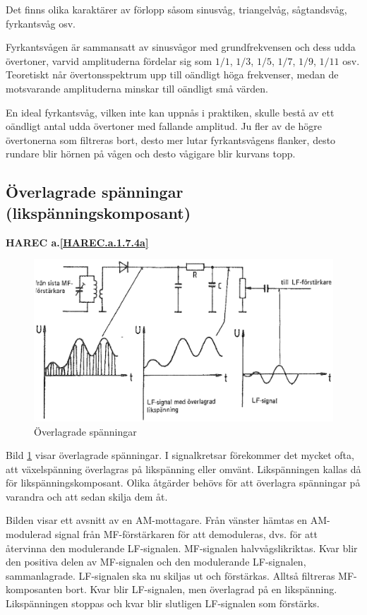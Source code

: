 Det finns olika karaktärer av förlopp såsom sinusvåg, triangelvåg, sågtandsvåg,
fyrkantsvåg osv.

Fyrkantsvågen är sammansatt av sinusvågor med grundfrekvensen och dess udda
övertoner, varvid amplituderna fördelar sig som \(1/1\), \(1/3\), \(1/5\),
\(1/7\), \(1/9\), \(1/11\) osv.
Teoretiskt når övertonsspektrum upp till oändligt höga frekvenser, medan de
motsvarande amplituderna minskar till oändligt små värden.

En ideal fyrkantsvåg, vilken inte kan uppnås i praktiken, skulle bestå av ett
oändligt antal udda övertoner med fallande amplitud.
Ju fler av de högre övertonerna som filtreras bort, desto mer lutar
fyrkantsvågens flanker, desto rundare blir hörnen på vågen och desto vågigare
blir kurvans topp.

\subsection{Överlagrade spänningar
(likspänningskomposant)}
\textbf{HAREC a.\ref{HAREC.a.1.7.4a}\label{myHAREC.a.1.7.4a}}

\begin{figure}[ht]
\includegraphics[width=\textwidth]{images/cropped_pdfs/bild_2_1-21.pdf}
\caption{Överlagrade spänningar}
\label{fig:BildII1-21}
\end{figure}

Bild \ref{fig:BildII1-21} visar överlagrade spänningar.
I signalkretsar förekommer det mycket ofta, att växelspänning överlagras på
likspänning eller omvänt.
Likspänningen kallas då för likspänningskomposant.
Olika åtgärder behövs för att överlagra spänningar på varandra och att sedan
skilja dem åt.

Bilden visar ett avsnitt av en AM-mottagare.
Från vänster hämtas en AM-modulerad signal från MF-förstärkaren för att
demoduleras, dvs. för att återvinna den modulerande LF-signalen.
MF-signalen halvvågslikriktas.
Kvar blir den positiva delen av MF-signalen och den modulerande LF-signalen,
sammanlagrade.
LF-signalen ska nu skiljas ut och förstärkas.
Alltså filtreras MF-komposanten bort.
Kvar blir LF-signalen, men överlagrad på en likspänning.
Likspänningen stoppas och kvar blir slutligen LF-signalen som förstärks.

